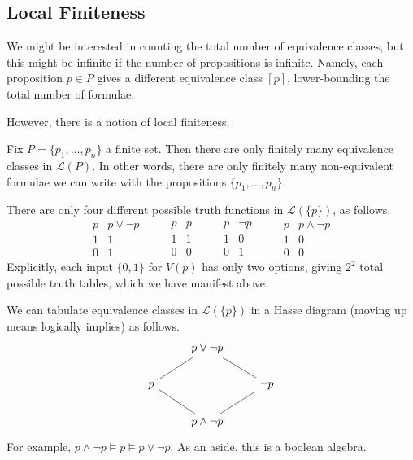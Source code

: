 \subsection{Local Finiteness}
We might be interested in counting the total number of equivalence classes, but this might be infinite if the number of propositions is infinite. Namely, each proposition $p\in P$ gives a different equivalence class $[p]$, lower-bounding the total number of formulae.

However, there is a notion of local finiteness.
\begin{proposition} \label{prop:localfiniteness}
	Fix $P=\{p_1,\ldots,p_n\}$ a finite set. Then there are only finitely many equivalence classes in $\mathcal L(P)$. In other words, there are only finitely many non-equivalent formulae we can write with the propositions $\{p_1,\ldots,p_n\}$.
\end{proposition}
\begin{example}
	There are only four different possible truth functions in $\mathcal L(\{p\})$, as follows.
	\[\begin{array}{c|c}
		p & p\lor\lnot p \\
		\hline
		1 & 1 \\
		0 & 1
	\end{array}\qquad\begin{array}{c|c}
		p & p \\
		\hline
		1 & 1 \\
		0 & 0
	\end{array}\qquad\begin{array}{c|c}
		p & \lnot p \\
		\hline
		1 & 0 \\
		0 & 1
	\end{array}\qquad\begin{array}{c|c}
		p & p\land\lnot p \\
		\hline
		1 & 0 \\
		0 & 0
	\end{array}\]
	Explicitly, each input $\{0,1\}$ for $V(p)$ has only two options, giving $2^2$ total possible truth tables, which we have manifest above.
\end{example}
\begin{remark}
	We can tabulate equivalence classes in $\mathcal L(\{p\})$ in a Hasse diagram (moving up means logically implies) as follows.
	\[\begin{tikzcd}
		& {p\lor\lnot p} \\
		p && {\lnot p} \\
		& {p\land\lnot p}
		\arrow[no head, from=3-2, to=2-1]
		\arrow[no head, from=2-1, to=1-2]
		\arrow[no head, from=3-2, to=2-3]
		\arrow[no head, from=2-3, to=1-2]
	\end{tikzcd}\]
	For example, $p\land\lnot p\models p\models p\lor\lnot p$. As an aside, this is a boolean algebra.
\end{remark}
